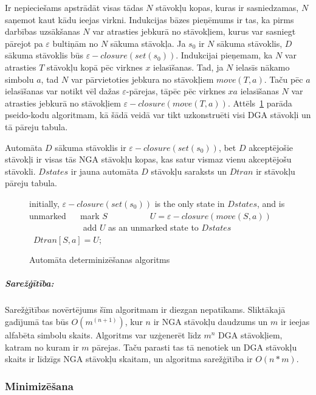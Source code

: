 Ir nepieciešams apstrādāt visas tādas $N$ stāvokļu kopas, kuras ir sasniedzamas, $N$ saņemot kaut kādu ieejas virkni. Indukcijas bāzes pieņēmums ir tas, ka pirms darbības uzsākšanas $N$ var atrasties jebkurā no stāvokļiem, kurus var sasniegt pārejot pa $\varepsilon$ bultiņām no $N$ sākuma stāvokļa. Ja $s_0$ ir $N$ sākuma stāvoklis, $D$ sākuma stāvoklis būs $\varepsilon-closure (set (s_0))$. Indukcijai pieņemam, ka $N$ var atrasties $T$ stāvokļu kopā pēc virknes $x$ ielasīšanas. Tad, ja $N$ ielasīs nākamo simbolu $a$, tad $N$ var pārvietoties jebkura no stāvokļiem $move (T, a)$. Taču pēc $a$ ielasīšanas var notikt vēl dažas $\varepsilon$-pārejas, tāpēc pēc virknes $xa$ ielasīšanas $N$ var atrasties jebkurā no stāvokļiem $\varepsilon-closure (move (T, a))$. Attēls~\ref{fig:det_algorithm} parāda pseido-kodu algoritmam, kā šādā veidā var tikt uzkonstruēti visi DGA stāvokļi un tā pāreju tabula.

Automāta $D$ sākuma stāvoklis ir $\varepsilon-closure (set (s_0))$, bet $D$ akceptējošie stāvokļi ir visas tās NGA stāvokļu kopas, kas satur vismaz vienu akceptējošu stāvokli. $Dstates$ ir jauna automāta $D$ stāvokļu saraksts un $Dtran$ ir stāvokļu pāreju tabula.

\begin{figure}[h]
  \begin{algorithmic}
  \State initially, $\varepsilon-closure (set (s_0))$  is the only state in $Dstates$, and is unmarked
      \State mark $S$
          \State $U = \varepsilon-closure (move (S, a))$
              \State add $U$ as an unmarked state to $Dstates$
          \EndIf
          \State $Dtran [S, a] = U$;
      \EndFor
  \EndWhile
  \end{algorithmic}
  \caption{\label{fig:det_algorithm}Automāta determinizēšanas algoritms}
\end{figure}

\subparagraph{Sarežģītība:} Sarežģītības novērtējums šīm algoritmam ir diezgan nepatīkams. Sliktākajā gadījumā tas būs $O(m^(n+1))$, kur $n$ ir NGA stāvokļu daudzums un $m$ ir ieejas alfabēta simbolu skaits. Algoritms var uzģenerēt līdz $m^n$ DGA stāvokļiem, katram no kuram ir $m$ pārejas. Taču parasti tas tā nenotiek un DGA stāvokļu skaits ir līdzīgs NGA stāvokļu skaitam, un algoritma sarežģītība ir $O(n*m)$. \cite{DragonBook, Hopcroft:IntroAutomataTheory}

\subsubsection{\label{sbsbs:prot_minimization}Minimizēšana}

